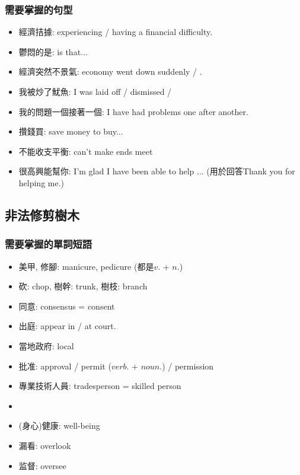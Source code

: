 \subsubsection*{需要掌握的句型}
\begin{itemize}
  \itemsep0em
  \item 經濟拮據: experiencing / having a financial difficulty.
  \item 鬱悶的是:  is that...
  \item 經濟突然不景氣: economy went down suddenly / .
  \item 我被炒了魷魚: I was laid off / dismissed / 
  \item 我的問題一個接著一個: I have had problems one after another.
  \item 攢錢買: save money to buy...
  \item 不能收支平衡: can't make ends meet
  \item 很高興能幫你: I'm glad I have been able to help ... (用於回答Thank you for helping me.)
\end{itemize}

\subsection{非法修剪樹木}
\subsubsection*{需要掌握的單詞短語}
\begin{itemize}
  \itemsep0em
  \item 美甲, 修腳: manicure, pedicure (都是$v.$ + $n.$)
  \item 砍: chop, 樹幹: trunk, 樹枝: branch
  \item 同意: consensus = consent
  \item 出庭: appear in / at court.
  \item 當地政府: local 
  \item 批准: approval / permit ($verb.$ + $noun.$) / permission
  \item 專業技術人員: tradesperson = skilled person
  \item {}
  \item (身心)健康: well-being
  \item 漏看: overlook
  \item 监督: oversee
\end{itemize}

